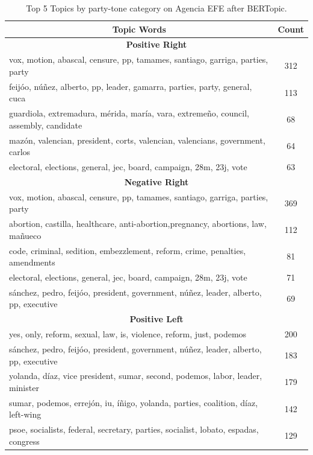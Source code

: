 \documentclass[12pt]{article}
\begin{document}
\begin{table}[!htb]
	\centering
	\caption{Top 5 Topics by party-tone category on Agencia EFE after BERTopic. }
	\begin{tabular}{|l|c|}
		\hline
				\multicolumn{1}{|c|}{\textbf{Topic Words}}& \textbf{Count} \\
		\hline
		\hline
		\multicolumn{2}{|c|}{\textbf{Positive Right}} \\
		\hline
		vox, motion, abascal, censure, pp, tamames, santiago, garriga, parties, party & 312 \\
		feijóo, núñez, alberto, pp, leader, gamarra, parties, party, general, cuca & 113 \\
		guardiola, extremadura, mérida, maría, vara, extremeño, council, assembly, candidate & 68 \\
		mazón, valencian, president, corts, valencian, valencians, government, carlos & 64 \\
		electoral, elections, general, jec, board, campaign, 28m, 23j, vote & 63 \\
		\hline
		\multicolumn{2}{|c|}{\textbf{Negative Right}} \\
		\hline
		vox, motion, abascal, censure, pp, tamames, santiago, garriga, parties, party & 369 \\
		abortion, castilla, healthcare, anti-abortion,pregnancy, abortions, law, mañueco & 112 \\
		code, criminal, sedition, embezzlement, reform, crime, penalties, amendments & 81 \\
		electoral, elections, general, jec, board, campaign, 28m, 23j, vote & 71 \\
		sánchez, pedro, feijóo, president, government, núñez, leader, alberto, pp, executive & 69 \\
		\hline
		\multicolumn{2}{|c|}{\textbf{Positive Left}} \\
		\hline
		yes, only, reform, sexual, law, is, violence, reform, just, podemos & 200 \\
		sánchez, pedro, feijóo, president, government, núñez, leader, alberto, pp, executive & 183 \\
		yolanda, díaz, vice president, sumar, second, podemos, labor, leader, minister & 179 \\
		sumar, podemos, errejón, iu, íñigo, yolanda, parties, coalition, díaz, left-wing & 142 \\
		psoe, socialists, federal, secretary, parties, socialist, lobato, espadas, congress & 129 \\
		\hline

\end{tabular}
\end{table}
\end{document}
